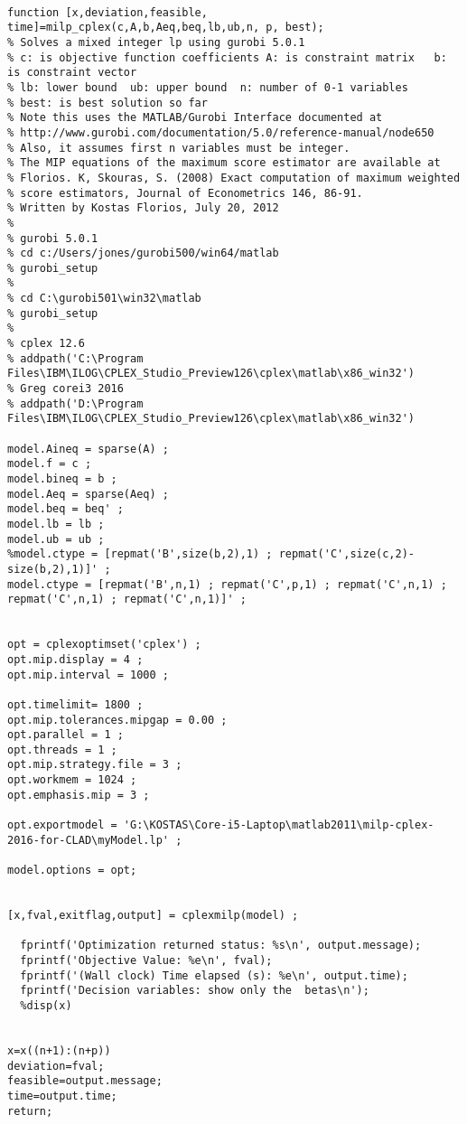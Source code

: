 \documentclass[12pt]{article}
\begin{document}
\begin{lstlisting}

function [x,deviation,feasible, time]=milp_cplex(c,A,b,Aeq,beq,lb,ub,n, p, best);   
% Solves a mixed integer lp using gurobi 5.0.1 
% c: is objective function coefficients A: is constraint matrix   b: is constraint vector
% lb: lower bound  ub: upper bound  n: number of 0-1 variables
% best: is best solution so far
% Note this uses the MATLAB/Gurobi Interface documented at
% http://www.gurobi.com/documentation/5.0/reference-manual/node650
% Also, it assumes first n variables must be integer.
% The MIP equations of the maximum score estimator are available at
% Florios. K, Skouras, S. (2008) Exact computation of maximum weighted
% score estimators, Journal of Econometrics 146, 86-91.
% Written by Kostas Florios, July 20, 2012
%
% gurobi 5.0.1
% cd c:/Users/jones/gurobi500/win64/matlab
% gurobi_setup
%
% cd C:\gurobi501\win32\matlab
% gurobi_setup
%
% cplex 12.6
% addpath('C:\Program Files\IBM\ILOG\CPLEX_Studio_Preview126\cplex\matlab\x86_win32')
% Greg corei3 2016
% addpath('D:\Program Files\IBM\ILOG\CPLEX_Studio_Preview126\cplex\matlab\x86_win32')

model.Aineq = sparse(A) ;
model.f = c ;
model.bineq = b ;
model.Aeq = sparse(Aeq) ;
model.beq = beq' ;
model.lb = lb ;
model.ub = ub ;
%model.ctype = [repmat('B',size(b,2),1) ; repmat('C',size(c,2)-size(b,2),1)]' ;
model.ctype = [repmat('B',n,1) ; repmat('C',p,1) ; repmat('C',n,1) ; repmat('C',n,1) ; repmat('C',n,1)]' ;


opt = cplexoptimset('cplex') ;
opt.mip.display = 4 ;
opt.mip.interval = 1000 ;

opt.timelimit= 1800 ;
opt.mip.tolerances.mipgap = 0.00 ;
opt.parallel = 1 ;
opt.threads = 1 ;
opt.mip.strategy.file = 3 ; 
opt.workmem = 1024 ;
opt.emphasis.mip = 3 ;

opt.exportmodel = 'G:\KOSTAS\Core-i5-Laptop\matlab2011\milp-cplex-2016-for-CLAD\myModel.lp' ;

model.options = opt;


[x,fval,exitflag,output] = cplexmilp(model) ;

  fprintf('Optimization returned status: %s\n', output.message);
  fprintf('Objective Value: %e\n', fval);
  fprintf('(Wall clock) Time elapsed (s): %e\n', output.time);
  fprintf('Decision variables: show only the  betas\n');
  %disp(x)


x=x((n+1):(n+p))
deviation=fval;
feasible=output.message;
time=output.time;
return;

\end{lstlisting}
\end{document}
